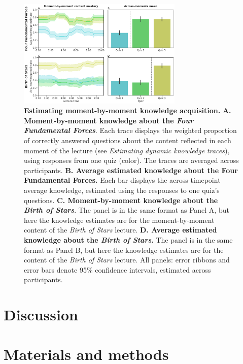 \documentclass[10pt]{article}
\begin{document}
\begin{figure}[tp]
    \centering
    \includegraphics[width=0.7\textwidth]{figs/content-mastery}
    
    \caption{\textbf{Estimating moment-by-moment knowledge acquisition.}
    \textbf{A. Moment-by-moment knowledge about the \textit{Four Fundamental
    Forces}}. Each trace displays the weighted proportion of correctly answered
    questions about the content reflected in each moment of the lecture (see
    \textit{Estimating dynamic knowledge traces}), using responses from one
    quiz (color). The traces are averaged across participants. \textbf{B.
    Average estimated knowledge about the \textbf{Four Fundamental Forces}.}
    Each bar displays the across-timepoint average knowledge, estimated using
    the responses to one quiz's questions. \textbf{C. Moment-by-moment
    knowledge about the \textit{Birth of Stars}}. The panel is in the same
    format as Panel A, but here the knowledge estimates are for the
    moment-by-moment content of the \textit{Birth of Stars} lecture. \textbf{D.
    Average estimated knowledge about the \textit{Birth of Stars}.} The panel
    is in the same format as Panel B, but here the knowledge estimates are for
    the content of the \textit{Birth of Stars} lecture. All panels: error
    ribbons and error bars denote 95\% confidence intervals, estimated across
    participants.}
    
    \label{fig:knowledge-timeseries}
    \end{figure}

\section*{Discussion}

\section*{Materials and methods}
\end{document}
